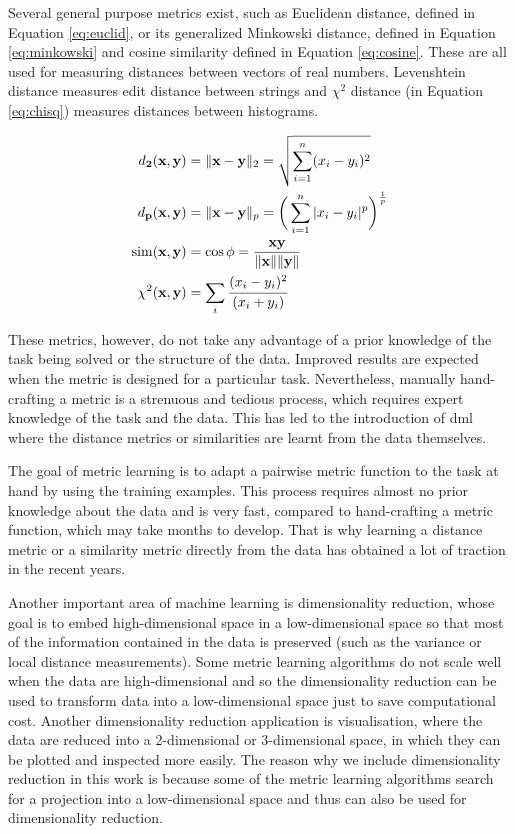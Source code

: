 \documentclass[12pt,a4paper]{report}
\begin{document}
Several general purpose metrics exist, such as Euclidean distance, defined in Equation \ref{eq:euclid}, or its generalized Minkowski distance, defined in Equation \ref{eq:minkowski} and cosine similarity defined in Equation \ref{eq:cosine}. These are all used for measuring distances between vectors of real numbers. Levenshtein distance measures edit distance between strings and $\chi^2$ distance (in Equation \ref{eq:chisq}) measures distances between histograms.

\begin{align}
d_{\mathbf{2}}(\textbf{x}, \textbf{y}) &= \|\textbf{x}-\textbf{y}\|_2 = \sqrt{\sum_{i=1}^{n} (x_i-y_i)^2} \label{eq:euclid} \\
d_{\mathbf{p}}(\textbf{x}, \textbf{y}) &= \|\textbf{x}-\textbf{y}\|_p = \bigg(\sum_{i=1}^{n} |x_i-y_i|^p\bigg)^\frac{1}{p} \label{eq:minkowski} \\
\mathrm{sim}(\textbf{x}, \textbf{y}) &= \cos{\phi} = \frac{\textbf{x}\textbf{y}}{\|\textbf{x}\|\|\textbf{y}\|} \label{eq:cosine} \\
\chi^2(\textbf{x}, \textbf{y}) &= \sum_{i} \cfrac{(x_i - y_i)^2} {(x_i + y_i)} \label{eq:chisq}
\end{align}

These metrics, however, do not take any advantage of a prior knowledge of the task being solved or the structure of the data. Improved results are expected when the metric is designed for a particular task. Nevertheless, manually hand-crafting a metric is a strenuous and tedious process, which requires expert knowledge of the task and the data. This has led to the introduction of \ac{dml} where the distance metrics or similarities are learnt from the data themselves.

The goal of metric learning is to adapt a pairwise metric function to the task at hand by using the training examples. This process requires almost no prior knowledge about the data and is very fast, compared to hand-crafting a metric function, which may take months to develop. That is why learning a distance metric or a similarity metric directly from the data has obtained a lot of traction in the recent years.

Another important area of machine learning is dimensionality reduction, whose goal is to embed high-dimensional space in a low-dimensional space so that most of the information contained in the data is preserved (such as the variance or local distance measurements). Some metric learning algorithms do not scale well when the data are high-dimensional and so the dimensionality reduction can be used to transform data into a low-dimensional space just to save computational cost. Another dimensionality reduction application is visualisation, where the data are reduced into a 2-dimensional or 3-dimensional space, in which they can be plotted and inspected more easily. The reason why we include dimensionality reduction in this work is because some of the metric learning algorithms search for a projection into a low-dimensional space and thus can also be used for dimensionality reduction.
\end{document}
